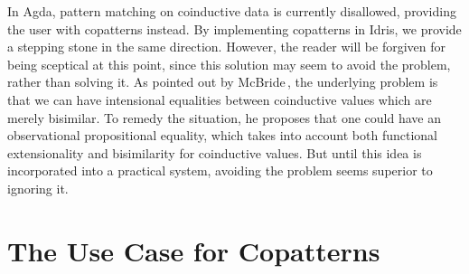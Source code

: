 In Agda, pattern matching on coinductive data is currently disallowed, providing
the user with copatterns instead. By implementing copatterns in Idris, we
provide a stepping stone in the same direction. However, the reader will be
forgiven for being sceptical at this point, since this solution may seem to
avoid the problem, rather than solving it. As pointed out by
McBride\,\citep{McBride:2009}, the underlying problem is that we can have
intensional equalities between coinductive values which are merely bisimilar. To
remedy the situation, he proposes that one could have an observational
propositional equality, which takes into account both functional extensionality
and bisimilarity for coinductive values. But until this idea is incorporated into a
practical system, avoiding the problem seems superior to ignoring it.


\section{The Use Case for Copatterns}
\label{sec:motivation_copatterns}



